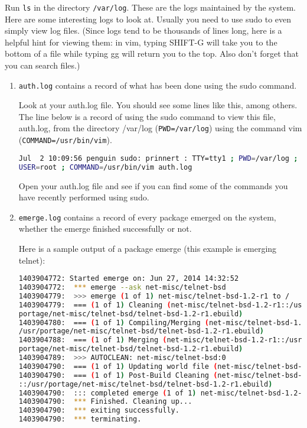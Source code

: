 \documentclass{article}
\begin{document}
\indent\indent Run \verb|ls| in the directory \verb|/var/log|. These are the logs maintained by the system. Here are some interesting logs to look at. Usually you need to use sudo to even simply view log files. (Since logs tend to be thousands of lines long, here is a helpful hint for viewing them: in vim, typing SHIFT-G will take you to the bottom of a file while typing gg will return you to the top. Also don't forget that you can search files.)

\begin{enumerate}

\item \verb|auth.log| contains a record of what has been done using the sudo command.

Look at your auth.log file. You should see some lines like this, among others. The line below is a record of using the sudo command to view this file, auth.log, from the directory /var/log (\verb|PWD=/var/log|) using the command vim (\verb|COMMAND=/usr/bin/vim|).

\begin{lstlisting}[basicstyle=\ttfamily, backgroundcolor = \color{lightgray}, language = bash, xleftmargin = 0cm, framexleftmargin = 1em]
Jul  2 10:09:56 penguin sudo: prinnert : TTY=tty1 ; PWD=/var/log ; 
USER=root ; COMMAND=/usr/bin/vim auth.log
\end{lstlisting}

Open your auth.log file and see if you can find some of the commands you have recently performed using sudo.

\item \verb|emerge.log| contains a record of every package emerged on the system, whether the emerge finished successfully or not.

Here is a sample output of a package emerge (this example is emerging telnet):
\begin{lstlisting}[basicstyle=\ttfamily, backgroundcolor = \color{lightgray}, language = bash, xleftmargin = 0cm, framexleftmargin = 1em]
1403904772: Started emerge on: Jun 27, 2014 14:32:52
1403904772:  *** emerge --ask net-misc/telnet-bsd
1403904779:  >>> emerge (1 of 1) net-misc/telnet-bsd-1.2-r1 to /
1403904779:  === (1 of 1) Cleaning (net-misc/telnet-bsd-1.2-r1::/usr/
portage/net-misc/telnet-bsd/telnet-bsd-1.2-r1.ebuild)
1403904780:  === (1 of 1) Compiling/Merging (net-misc/telnet-bsd-1.2-r1::
/usr/portage/net-misc/telnet-bsd/telnet-bsd-1.2-r1.ebuild)
1403904788:  === (1 of 1) Merging (net-misc/telnet-bsd-1.2-r1::/usr/
portage/net-misc/telnet-bsd/telnet-bsd-1.2-r1.ebuild)
1403904789:  >>> AUTOCLEAN: net-misc/telnet-bsd:0
1403904790:  === (1 of 1) Updating world file (net-misc/telnet-bsd-1.2-r1)
1403904790:  === (1 of 1) Post-Build Cleaning (net-misc/telnet-bsd-1.2-r1
::/usr/portage/net-misc/telnet-bsd/telnet-bsd-1.2-r1.ebuild)
1403904790:  ::: completed emerge (1 of 1) net-misc/telnet-bsd-1.2-r1 to /
1403904790:  *** Finished. Cleaning up...
1403904790:  *** exiting successfully.
1403904790:  *** terminating.
\end{lstlisting}


\end{enumerate}
\end{document}
